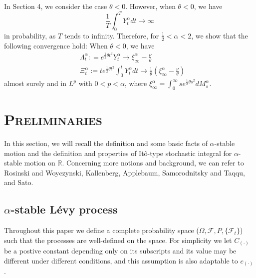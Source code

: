 \documentclass[11pt]{amsart}
\theoremstyle{plain}
\numberwithin{equation}{section}
\begin{document}
In Section 4, we consider the case $\theta<0$. However, when $\theta<0$, we have
$$
\frac{1}{T}\int_0^T Y_t^\alpha dt\longrightarrow \infty
$$
in probability, as $T$ tends to infinity. Therefore, for $\frac{1}{2}<\alpha<2$, we show that the following convergence hold: 
When $\theta<0$, we have
\begin{equation*}
\begin{aligned}
&\Lambda_t^\alpha: = e^{\frac{1}{2}\theta t^2}Y_t^\alpha \longrightarrow \xi_\infty^\alpha-\frac{\nu}{\theta}\\
&\Xi_t^\alpha :=te^{\frac{1}{2}\theta t^2}\int_0^t Y_t^\alpha dt\longrightarrow \frac{1}{\theta}\left(\xi_\infty^\alpha-\frac{\nu}{\theta}\right)
\end{aligned}
\end{equation*}
almost surely and in $L^p$ with $0<p<\alpha$, where $\xi_\infty^\alpha=\int_0^\infty se^{\frac{1}{2}\theta s^2}dM_s^\alpha$.

\section{\textsc{Preliminaries}}
In this section, we will recall the definition and some basic facts of $\alpha$-stable motion and the definition and properties of It\^{o}-type stochastic integral for $\alpha$-stable motion on $\mathbb{R}$. Concerning more notions and background, we can refer to Rosinski and Woyczynski\cite{Rosinski}, Kallenberg\cite{Kallenberg}, Applebaum\cite{Applebaum}, Samorodnitsky and Taqqu\cite{Samorodnitsky}, and Sato\cite{Sato}.

\subsection{$\alpha$-stable L\'{e}vy process}
Throughout this paper we define a complete probability space ($\Omega,\mathcal{F},P,\{\mathscr{F}_t\}$) such that the processes are well-defined on the space. For simplicity we let $C_{(\cdot)}$ be a postive constant depending only on its subscripts and its value may be different under different conditions, and this assumption is also adaptable to $c_{(\cdot)}$.
\end{document}
